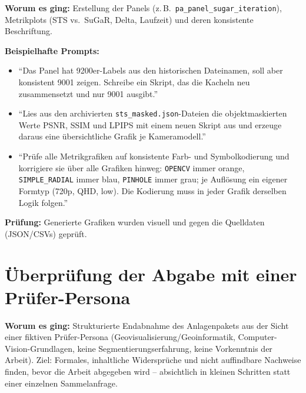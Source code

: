 \documentclass[12pt,a4paper]{article}
\begin{document}
\textbf{Worum es ging:} Erstellung der Panels (z.\,B.\ \texttt{pa\_panel\_sugar\_iteration}), Metrikplots (STS vs.\ SuGaR, Delta, Laufzeit) und deren konsistente Beschriftung.

\textbf{Beispielhafte Prompts:}
\begin{itemize}
  \item \enquote{Das Panel hat 9200er-Labels aus den historischen Dateinamen, soll aber konsistent 9001 zeigen. Schreibe ein Skript, das die Kacheln neu zusammensetzt und nur 9001 ausgibt.}
  \item \enquote{Lies aus den archivierten \texttt{sts\_masked.json}-Dateien die objektmaskierten Werte PSNR, SSIM und LPIPS mit einem neuen Skript aus und erzeuge daraus eine übersichtliche Grafik je Kameramodell.}
  \item \enquote{Prüfe alle Metrikgrafiken auf konsistente Farb- und Symbolkodierung und korrigiere sie über alle Grafiken hinweg: \texttt{OPENCV} immer orange, \texttt{SIMPLE\_RADIAL} immer blau, \texttt{PINHOLE} immer grau; je Auflösung ein eigener Formtyp (720p, QHD, low). Die Kodierung muss in jeder Grafik derselben Logik folgen.}
\end{itemize}

\textbf{Prüfung:} Generierte Grafiken wurden visuell und gegen die Quelldaten (JSON/CSVs) geprüft.

\section{Überprüfung der Abgabe mit einer Prüfer-Persona}

\textbf{Worum es ging:} Strukturierte Endabnahme des Anlagenpakets aus der
Sicht einer fiktiven Prüfer-Persona (Geovisualisierung/Geoinformatik,
Computer-Vision-Grundlagen, keine Segmentierungserfahrung, keine Vorkenntnis
der Arbeit). Ziel: Formales, inhaltliche Widersprüche und nicht auffindbare
Nachweise finden, bevor die Arbeit abgegeben wird -- absichtlich in kleinen
Schritten statt einer einzelnen Sammelanfrage.
\end{document}
